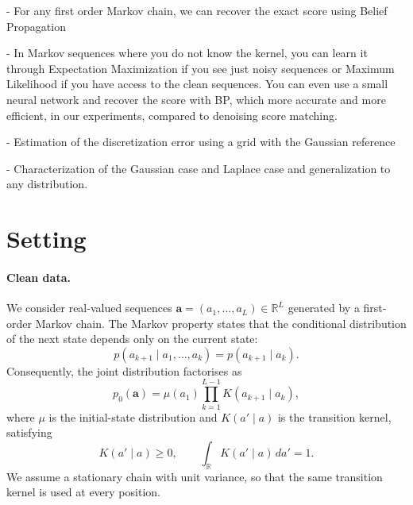 \documentclass{article}
\begin{document}
- For any first order Markov chain, we can recover the exact score using Belief Propagation

- In Markov sequences where you do not know the kernel, you can learn it through Expectation Maximization if you see just noisy sequences or Maximum Likelihood if you have access to the clean sequences. You can even use a small neural network and recover the score with BP, which more accurate and more efficient, in our experiments, compared to denoising score matching. 

- Estimation of the discretization error using a grid with the Gaussian reference

- Characterization of the Gaussian case and Laplace case and generalization to any distribution.
\section{Setting}
\label{sec:setting}


\paragraph{Clean data.}
We consider real-valued sequences
$\mathbf{a}=(a_1,\ldots,a_L)\in\mathbb{R}^L$
generated by a first-order Markov chain. The Markov property
states that the conditional distribution of the next state
depends only on the current state:
\begin{equation}
p(a_{k+1}\mid a_1,\ldots,a_k)
=
p(a_{k+1}\mid a_k).
\end{equation}
Consequently, the joint distribution factorises as
\begin{equation}
p_0(\mathbf{a})
=
\mu(a_1)
\prod_{k=1}^{L-1}
K(a_{k+1}\mid a_k),
\label{eq:markov_prior}
\end{equation}
where $\mu$ is the initial-state distribution and
$K(a'\mid a)$ is the transition kernel, satisfying
\begin{equation}
K(a'\mid a)\geq 0,
\qquad
\int_{\mathbb{R}} K(a'\mid a)\,da'=1.
\end{equation}
We assume a stationary chain with unit variance, so that
the same transition kernel is used at every position.
\end{document}
